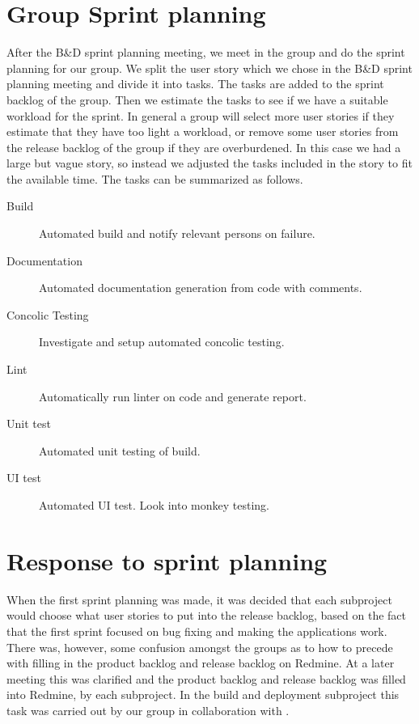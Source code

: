 \section{Group Sprint planning}

After the B\&D sprint planning meeting, we meet in the group and do the sprint planning for our group. We split the user story which we chose in the B\&D sprint planning meeting and divide it into tasks. The tasks are added to the sprint backlog of the group. Then we estimate the tasks to see if we have a suitable workload for the sprint. In general a group will select more user stories if they estimate that they have too light a workload, or remove some user stories from the release backlog of the group if they are overburdened. In this case we had a large but vague story, so instead we adjusted the tasks included in the story to fit the available time. The tasks can be summarized as follows.

\begin{description}
    \item[Build] Automated build and notify relevant persons on failure.
    \item[Documentation] Automated documentation generation from code with comments.
    \item[Concolic Testing] Investigate and setup automated concolic testing.
    \item[Lint] Automatically run linter on code and generate report.
    \item[Unit test] Automated unit testing of build.
    \item[UI test] Automated UI test. Look into monkey testing. 
\end{description}

\section{Response to sprint planning}

When the first sprint planning was made, it was decided that each subproject would choose what user stories to put into the release backlog, based on the fact that the first sprint focused on bug fixing and making the applications work. There was, however, some confusion amongst the groups as to how to precede with filling in the product backlog and release backlog on Redmine. At a later meeting this was clarified and the product backlog and release backlog was filled into Redmine, by each subproject. In the build and deployment subproject this task was carried out by our group in collaboration with .
